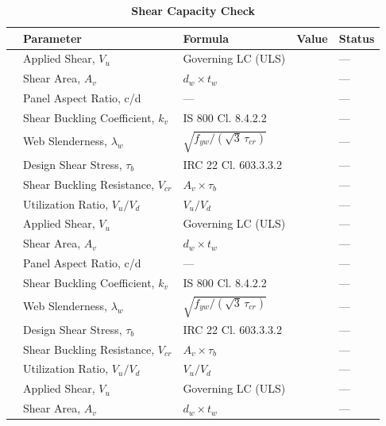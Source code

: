 \documentclass[12pt,a4paper]{report}
\numberwithin{table}{chapter}
\numberwithin{figure}{chapter}
\begin{document}
\vspace{1em}
\begin{longtable}{|C{2.5cm}|C{3.5cm}|C{3.5cm}|>{\centering\arraybackslash}p{4.2cm}|C{1.8cm}|}
\caption{\textbf{Shear Capacity Check}}\\
\hline
\textbf{} & \textbf{Parameter} & \textbf{Formula} & \textbf{Value} & \textbf{Status} \\[6pt]
\hline
{} & Applied Shear, $V_u$ & Governing LC (ULS) &  & --- \\[6pt]
 & Shear Area, $A_v$ & $d_w \times t_w$ &  & --- \\[6pt]
 & Panel Aspect Ratio, c/d & --- &  & --- \\[6pt]
 & Shear Buckling Coefficient, $k_v$ & IS 800 Cl. 8.4.2.2 &  & --- \\[6pt]
 & Web Slenderness, $\lambda_w$ & $\sqrt{f_{yw}/(\sqrt{3}\,\tau_{cr})}$ &  & --- \\[6pt]
 & Design Shear Stress, $\tau_b$ & IRC 22 Cl. 603.3.3.2 &  & --- \\[6pt]
 & Shear Buckling Resistance, $V_{cr}$ & $A_v \times \tau_b$ &  & --- \\[6pt]
 & Utilization Ratio, $V_u / V_d$ & $V_u / V_d$ &  & --- \\[6pt]
\hline
{} & Applied Shear, $V_u$ & Governing LC (ULS) &  & --- \\[6pt]
 & Shear Area, $A_v$ & $d_w \times t_w$ &  & --- \\[6pt]
 & Panel Aspect Ratio, c/d & --- &  & --- \\[6pt]
 & Shear Buckling Coefficient, $k_v$ & IS 800 Cl. 8.4.2.2 &  & --- \\[6pt]
 & Web Slenderness, $\lambda_w$ & $\sqrt{f_{yw}/(\sqrt{3}\,\tau_{cr})}$ &  & --- \\[6pt]
 & Design Shear Stress, $\tau_b$ & IRC 22 Cl. 603.3.3.2 &  & --- \\[6pt]
 & Shear Buckling Resistance, $V_{cr}$ & $A_v \times \tau_b$ &  & --- \\[6pt]
 & Utilization Ratio, $V_u / V_d$ & $V_u / V_d$ &  & --- \\[6pt]
\hline
{} & Applied Shear, $V_u$ & Governing LC (ULS) &  & --- \\[6pt]
 & Shear Area, $A_v$ & $d_w \times t_w$ &  & --- \\[6pt]

\end{longtable}
\end{document}
